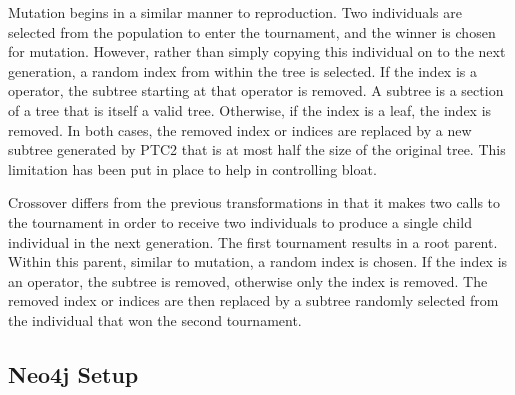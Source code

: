 \documentclass[12pt]{article}
\begin{document}
Mutation begins in a similar manner to reproduction. Two individuals are selected from the population to enter the tournament, and the winner is chosen for mutation. However, rather than simply copying this individual on to the next generation, a random index from within the tree is selected. If the index is a operator, the subtree starting at that operator is removed. A subtree is a section of a tree that is itself a valid tree. Otherwise, if the index is a leaf, the index is removed. In both cases, the removed index or indices are replaced by a new subtree generated by PTC2 that is at most half the size of the original tree. This limitation has been put in place to help in controlling bloat.

Crossover differs from the previous transformations in that it makes two calls to the tournament in order to receive two individuals to produce a single child individual in the next generation. The first tournament results in a root parent. Within this parent, similar to mutation, a random index is chosen. If the index is an operator, the subtree is removed, otherwise only the index is removed. The removed index or indices are then replaced by a subtree randomly selected from the individual that won the second tournament.

\subsection{Neo4j Setup}
\label{sec:Neo4jSetup}
\end{document}
